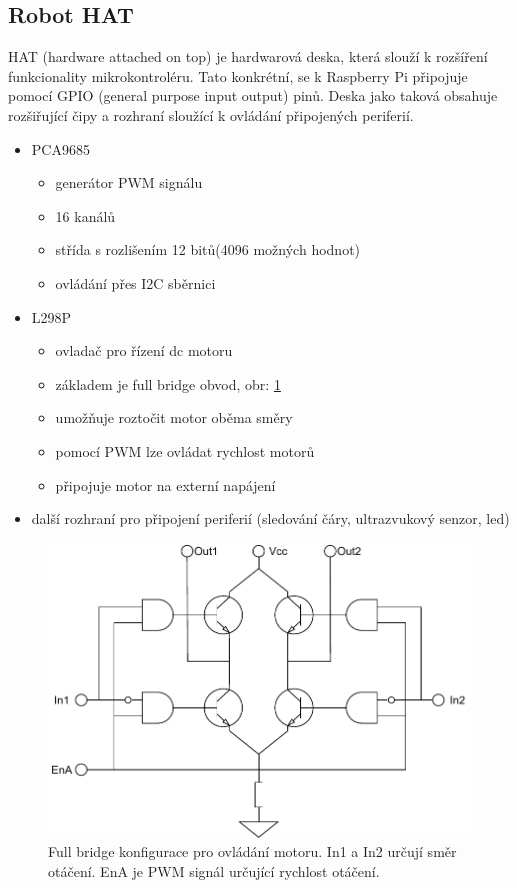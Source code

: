 \subsection*{Robot HAT}
HAT (hardware attached on top) je hardwarová deska, která slouží k rozšíření funkcionality mikrokontroléru. Tato konkrétní, se k Raspberry Pi připojuje pomocí GPIO (general purpose input output) pinů. Deska jako taková obsahuje rozšiřující čipy a rozhraní sloužící k ovládání připojených periferií.

\newpage
\begin{itemize}
	\item{PCA9685 \cite[str:~2]{pca9685}}
	\begin{itemize}
		\item{generátor PWM signálu}
		\item{16 kanálů}
		\item{střída s rozlišením 12 bitů(4096 možných hodnot)}
		\item{ovládání přes I2C sběrnici}
	\end{itemize}
	\item{L298P \cite{l298}}
	\begin{itemize}
		\item{ovladač pro řízení dc motoru}
		\item{základem je full bridge obvod, obr: \ref{fig:full_bridge}}
		\item{umožňuje roztočit motor oběma směry}
		\item{pomocí PWM lze ovládat rychlost motorů}
		\item{připojuje motor na externí napájení}
	\end{itemize}
	\item{další rozhraní pro připojení periferií (sledování čáry, ultrazvukový senzor, led)}
\end{itemize}

\begin{figure}[h!]
	\centering
	\includegraphics[scale=0.75]{obrazky-figures/motor_full_bridge.pdf}
	\caption[Full bridge zapojení ovladače stejnosměrných motorů]{Full bridge konfigurace pro ovládání motoru. In1 a In2 určují směr otáčení. EnA je PWM signál určující rychlost otáčení. \cite[str:~1]{l298}}
	\label{fig:full_bridge}
\end{figure}

